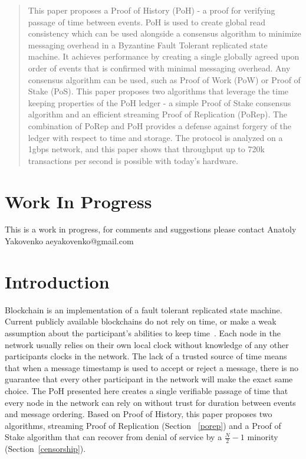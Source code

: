\documentclass[12pt]{article}
\begin{document}
\maketitle

\begin{abstract}
This paper proposes a Proof of History (PoH) - a proof for verifying passage of time between events. PoH is used to create global read consistency which can be used alongside a consensus algorithm to minimize messaging overhead in a Byzantine Fault Tolerant replicated state machine.  It achieves performance by creating a single globally agreed upon order of events that is confirmed with minimal messaging overhead. Any consensus algorithm can be used, such as Proof of Work (PoW) or Proof of Stake (PoS).  This paper proposes two algorithms that leverage the time keeping properties of the PoH ledger - a simple Proof of Stake consensus algorithm and an efficient streaming Proof of Replication (PoRep).  The combination of PoRep and PoH provides a defense against forgery of the ledger with respect to time and storage.  The protocol is analyzed on a 1gbps network, and this paper shows that throughput up to 720k transactions per second is possible with today's hardware.
\end{abstract}

\section{Work In Progress}
This is a work in progress, for comments and suggestions please contact Anatoly Yakovenko aeyakovenko@gmail.com

\section{Introduction}
Blockchain is an implementation of a fault tolerant replicated state machine.  Current publicly available blockchains do not rely on time, or make a weak assumption about the participant's abilities to keep time~\cite{tendermint}.  Each node in the network usually relies on their own local clock without knowledge of any other participants clocks in the network.  The lack of a trusted source of time means that when a message timestamp is used to accept or reject a message, there is no guarantee that every other participant in the network will make the exact same choice.  The PoH presented here creates a single verifiable passage of time that every node in the network can rely on without trust for duration between events and message ordering.  Based on Proof of History, this paper proposes two algorithms, streaming Proof of Replication (Section ~\ref{porep}) and a Proof of Stake algorithm that can recover from denial of service by a \(\frac{N}{2} - 1\) minority (Section~\ref{censorship}).
\end{document}
